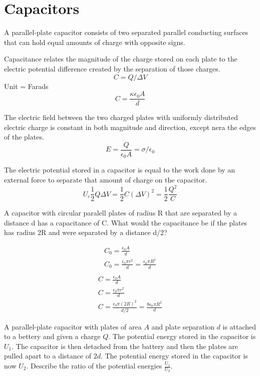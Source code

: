 \documentclass[../em.tex]{subfiles}
\begin{document}
\section{Capacitors}
A parallel-plate capacitor consists of two separated parallel conducting surfaces 
that can hold equal amounts of charge with opposite signs.

Capacitance relates the magnitude of the charge stored on each plate to the electric 
potential difference created by the separation of those charges.
\[C = Q/\Delta V\] 
Unit = Farads
\[C = \frac{\kappa \epsilon_0 A}{d}\]

The electric field between the two charged plates with uniformly distributed 
electric charge is constant in both magnitude and direction, except nera the edges of the plates.
\[E = \frac{Q}{\epsilon_0 A} = \sigma/\epsilon_0\]

The electric potential stored in a capacitor is equal to the work done by an external force 
to separate that amount of charge on the capacitor.
\[U_c \frac{1}{2}Q\Delta V = \frac{1}{2}C(\Delta V)^2 = \frac{1}{2}\frac{Q^2}{C}\]

\begin{example}
    A capacitor with circular paralell plates of radius R that are separated by a distance d 
    has a capacitance of C. What would the capacitance be if the plates has radius 2R and 
    were separated by a distance d/2?

    \begin{align*}
        C_0 = \frac{\epsilon_0 A}{d}\\ 
        C_0 = \frac{\epsilon_0\pi r^2}{d}=\frac{\epsilon_0 \pi R^2}{d}\\
    \end{align*}
    \begin{align*}
        C = \frac{\epsilon_0 A}{d}\\
        C = \frac{\epsilon_0 \pi r^2}{d}\\
        C = \frac{\epsilon_0 \pi (2R)^2}{d/2} = \frac{8\epsilon_0\pi R^2}{d}
    \end{align*}
\end{example}

\ex A parallel-plate capacitor with plates of area $A$ and plate separation $d$ is attached to a bettery and given a charge $Q$. The potential energy stored in the capacitor is $U_1$. The capacitor is then detached from the battery 
and then the plates are pulled apart to a distance of $2d$. The potential energy stored in the capacitor is now $U_2$. 
Describe the ratio of the potential energies $\frac{U_1}{U_2}$.
\end{document}
